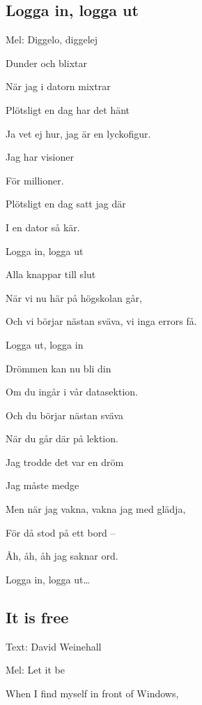 

\pagestyle{Datasånger}



\subsection{\textbf{Logga in, logga ut}}

Mel: Diggelo, diggelej

Dunder och blixtar

När jag i datorn mixtrar

Plötsligt en dag har det hänt

Ja vet ej hur, jag är en lyckofigur.\bigskip

Jag har visioner

För millioner.

Plötsligt en dag satt jag där

I en dator så kär.\bigskip

Logga in, logga ut

Alla knappar till slut

När vi nu här på högskolan går,

Och vi börjar nästan sväva, vi inga errors få.

Logga ut, logga in

Drömmen kan nu bli din

Om du ingår i vår datasektion.

Och du börjar nästan sväva

När du går där på lektion.\bigskip

Jag trodde det var en dröm

Jag måste medge

Men när jag vakna, vakna jag med glädja,

För då stod på ett bord –

Åh, åh, åh jag saknar ord.\bigskip

Logga in, logga ut…\bigskip

\subsection{\textbf{It is free }}

Text: David Weinehall

Mel: Let it be\bigskip

When I find myself in front of Windows,

